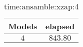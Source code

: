 \begin{table}[!ht]
	\centering
	\begin{tabular}{|c|c|}
		\hline
		Models & elapsed \\ \hline
		$4$ & $843.80$ \\ \hline
	\end{tabular}
	\caption{time:ansamble:xzap:4}
	\label{tab:time:ansamble:xzap:4}
\end{table}
